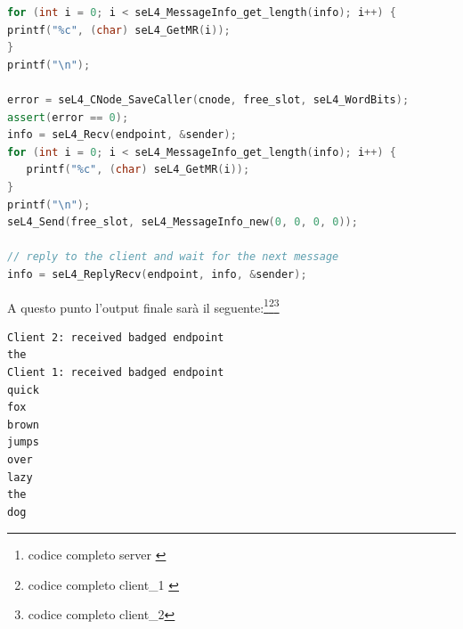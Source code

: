 \begin{lstlisting}[language=C++]
for (int i = 0; i < seL4_MessageInfo_get_length(info); i++) {
printf("%c", (char) seL4_GetMR(i));
}
printf("\n");

error = seL4_CNode_SaveCaller(cnode, free_slot, seL4_WordBits);
assert(error == 0);
info = seL4_Recv(endpoint, &sender);
for (int i = 0; i < seL4_MessageInfo_get_length(info); i++) {
   printf("%c", (char) seL4_GetMR(i));
}
printf("\n");
seL4_Send(free_slot, seL4_MessageInfo_new(0, 0, 0, 0));

// reply to the client and wait for the next message
info = seL4_ReplyRecv(endpoint, info, &sender);
\end{lstlisting}
A questo punto l'output finale sarà il seguente:\footnote{codice completo server \cite{IPCserver}}\footnote{codice completo client\_1 \cite{IPCclient1}}\footnote{codice completo client\_2\cite{IPCclient2}}
\begin{lstlisting}[language=bash]
Client 2: received badged endpoint
the
Client 1: received badged endpoint
quick
fox
brown
jumps
over
lazy
the
dog
\end{lstlisting}
